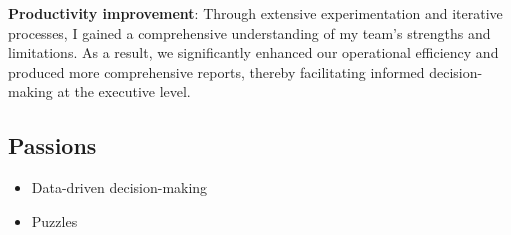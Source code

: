 \documentclass[
  letterpaper,
  DIV=11,
  numbers=noendperiod]{scrartcl}
\providecommand{\tightlist}{%
  \setlength{\itemsep}{0pt}\setlength{\parskip}{0pt}}\usepackage{longtable,booktabs,array}
\begin{document}
\textbf{Productivity improvement}: Through extensive experimentation and
iterative processes, I gained a comprehensive understanding of my team's
strengths and limitations. As a result, we significantly enhanced our
operational efficiency and produced more comprehensive reports, thereby
facilitating informed decision-making at the executive level.

\subsection{Passions}\label{passions}

\begin{itemize}
\tightlist
\item
  Data-driven decision-making
\item
  Puzzles
\end{itemize}
\end{document}
